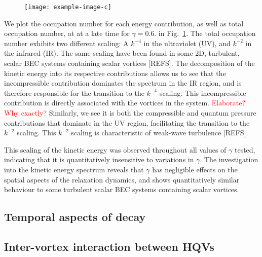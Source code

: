 \begin{figure}
    \centering
    \texttt{[image: example-image-c]}
    \caption{}
    \label{fig:kinetic-energy-spectra}
\end{figure}
We plot the occupation number for each energy contribution, as well as total
occupation number, at at a late time for $\gamma=0.6.$ in
Fig.~\ref{fig:kinetic-energy-spectra}.
The total occupation number exhibits two different scaling: A $k^{-4}$ in the
ultraviolet (UV), and $k^{-2}$ in the infrared (IR). 
The same scaling have been found in some 2D, turbulent, scalar BEC systems
containing scalar vortices [REFS].
The decomposition of the kinetic energy into its respective contributions
allows us to see that the incompressible contribution dominates the spectrum
in the IR region, and is therefore responsible for the transition to the
$k^{-4}$ scaling.
This incompressible contribution is directly associated with the vortices in
the system. \textcolor{red}{Elaborate? Why exactly?}
Similarly, we see it is both the compressible and quantum pressure contributions
that dominate in the UV region, facilitating the transition to the $k^{-2}$
scaling.
This $k^{-2}$ scaling is characteristic of weak-wave turbulence [REFS].

This scaling of the kinetic energy was observed throughout all values of
$\gamma$ tested, indicating that it is quantitatively insensitive to variations
in $\gamma$.
The investigation into the kinetic energy spectrum reveals that $\gamma$ has
negligible effects on the spatial aspects of the relaxation dynamics, and shows
quantitatively similar behaviour to some turbulent scalar BEC systems
containing scalar vortices.

\subsection{Temporal aspects of decay}

\subsection{Inter-vortex interaction between HQVs}
